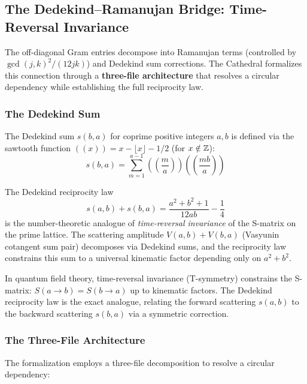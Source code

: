 \subsection{The Dedekind--Ramanujan Bridge: Time-Reversal Invariance}
\label{sec:dedekind-ramanujan}

The off-diagonal Gram entries decompose into Ramanujan terms (controlled
by $\gcd(j,k)^2/(12jk)$) and Dedekind sum corrections. The Cathedral
formalizes this connection through a \textbf{three-file architecture}
that resolves a circular dependency while establishing the full
reciprocity law.

\subsubsection{The Dedekind Sum}

The Dedekind sum $s(b,a)$ for coprime positive integers $a, b$ is defined via
the sawtooth function $((x)) = x - \lfloor x \rfloor - 1/2$ (for $x \notin \mathbb{Z}$):
\[
  s(b,a) = \sum_{m=1}^{a-1} \left(\!\left(\frac{m}{a}\right)\!\right)
  \left(\!\left(\frac{mb}{a}\right)\!\right)
\]

\begin{correspondence}
\label{corr:dedekind-reciprocity}
The Dedekind reciprocity law
\[
  s(a,b) + s(b,a) = \frac{a^2 + b^2 + 1}{12ab} - \frac{1}{4}
\]
is the number-theoretic analogue of \emph{time-reversal invariance}
of the S-matrix on the prime lattice. The scattering amplitude
$V(a,b) + V(b,a)$ (Vasyunin cotangent sum pair) decomposes via
Dedekind sums, and the reciprocity law constrains this sum to
a universal kinematic factor depending only on $a^2 + b^2$.

In quantum field theory, time-reversal invariance (T-symmetry)
constrains the S-matrix: $S(a \to b) = S(b \to a)$ up to
kinematic factors. The Dedekind reciprocity law is the exact
analogue, relating the forward scattering $s(a,b)$ to the
backward scattering $s(b,a)$ via a symmetric correction.
\end{correspondence}

\subsubsection{The Three-File Architecture}

The formalization employs a three-file decomposition to resolve
a circular dependency:

